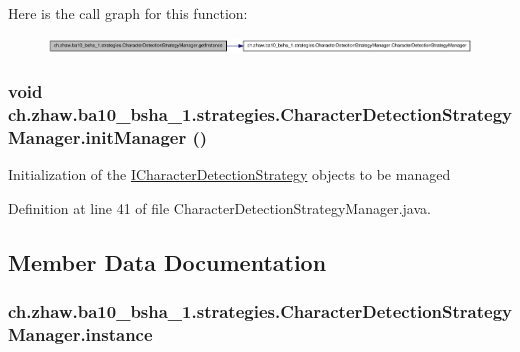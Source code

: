 Here is the call graph for this function:\nopagebreak
\begin{figure}[H]
\begin{center}
\leavevmode
\includegraphics[width=420pt]{classch_1_1zhaw_1_1ba10__bsha__1_1_1strategies_1_1CharacterDetectionStrategyManager_a380560b40e543ce6b16f7537874e8617_cgraph}
\end{center}
\end{figure}
\hypertarget{classch_1_1zhaw_1_1ba10__bsha__1_1_1strategies_1_1CharacterDetectionStrategyManager_a5a77dec09ef522e5e547377159de89ef}{
\subsubsection[{initManager}]{\setlength{\rightskip}{0pt plus 5cm}void ch.zhaw.ba10\_\-bsha\_\-1.strategies.CharacterDetectionStrategyManager.initManager ()}}
\label{classch_1_1zhaw_1_1ba10__bsha__1_1_1strategies_1_1CharacterDetectionStrategyManager_a5a77dec09ef522e5e547377159de89ef}
Initialization of the \hyperlink{interfacech_1_1zhaw_1_1ba10__bsha__1_1_1strategies_1_1ICharacterDetectionStrategy}{ICharacterDetectionStrategy} objects to be managed 

Definition at line 41 of file CharacterDetectionStrategyManager.java.

\subsection{Member Data Documentation}
\hypertarget{classch_1_1zhaw_1_1ba10__bsha__1_1_1strategies_1_1CharacterDetectionStrategyManager_a181b41a12f8712fa1eebcaaa4879c26d}{
\subsubsection[{instance}]{ {\bf ch.zhaw.ba10\_\-bsha\_\-1.strategies.CharacterDetectionStrategyManager.instance}}}
\label{classch_1_1zhaw_1_1ba10__bsha__1_1_1strategies_1_1CharacterDetectionStrategyManager_a181b41a12f8712fa1eebcaaa4879c26d}


